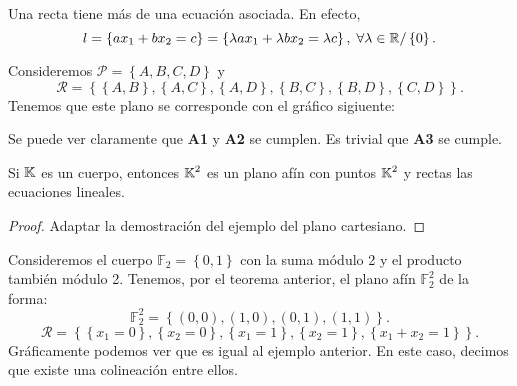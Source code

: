 \begin{observation}
Una recta tiene más de una ecuación asociada. En efecto,
\[l = \left\{ ax_{1} + bx_{2} = c\right\}  = \left\{ \lambda ax_{1} + \lambda bx_{2} = \lambda c\right\}, \; \forall \lambda \in \mathbb{R} / \left\{ 0\right\}  .\]
\end{observation}
\begin{eg}
	Consideremos $\displaystyle \mathcal{P} = \left\{ A, B, C, D\right\}  $ y 
	\[\mathcal{R} = \left\{ \left\{ A,B\right\} , \left\{ A,C\right\} , \left\{ A,D\right\} , \left\{ B, C\right\} , \left\{ B,D\right\} , \left\{ C,D\right\} \right\}  .\]
Tenemos que este plano se corresponde con el gráfico sigiuente:
\begin{center}
\end{center}
Se puede ver claramente que \textbf{A1} y \textbf{A2} se cumplen. Es trivial que \textbf{A3} se cumple.	
\end{eg}
\begin{theorem}
Si $\displaystyle \mathbb{K} $ es un cuerpo, entonces $\displaystyle \mathbb{K}^{2} $ es un plano afín con puntos $\displaystyle \mathbb{K}^{2} $ y rectas las ecuaciones lineales.
\end{theorem}
\begin{proof}
Adaptar la demostración del ejemplo del plano cartesiano.
\end{proof}
\begin{eg}
	Consideremos el cuerpo $\displaystyle \mathbb{F}_{2} = \left\{ 0,1\right\}  $ con la suma módulo 2 y el producto también módulo 2.
	Tenemos, por el teorema anterior, el plano afín $\displaystyle \mathbb{F}_{2}^{2} $ de la forma:
	\[\mathbb{F}_{2}^{2} = \left\{ \left(0,0\right), \left(1,0\right), \left(0,1\right), \left(1,1\right)\right\} .\]
	\[\mathcal{R} = \left\{ \left\{ x_{1} = 0\right\}, \left\{ x_{2} = 0\right\}, \left\{ x_{1} = 1\right\}, \left\{ x_{2} = 1\right\}, \left\{ x_{1} + x_{2} = 1\right\} \right\}  .\]
Gráficamente podemos ver que es igual al ejemplo anterior. En este caso, decimos que existe una colineación entre ellos.	
\end{eg}
